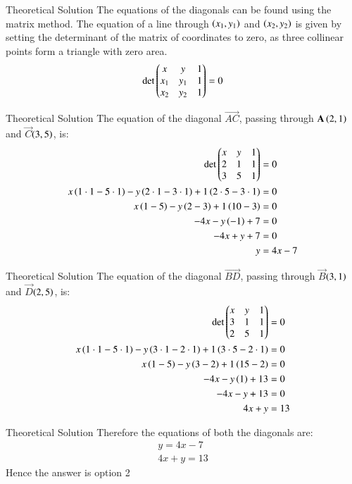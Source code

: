 \documentclass{beamer}
\begin{document}
\begin{frame}{Theoretical Solution}
The equations of the diagonals can be found using the matrix method. The equation of a line through $\left(x_1, y_1\right)$ and $\left(x_2, y_2\right)$ is given by setting the determinant of the matrix of coordinates to zero, as three collinear points form a triangle with zero area.
\begin{align*}
    \det \begin{pmatrix} x & y & 1 \\ x_1 & y_1 & 1 \\ x_2 & y_2 & 1 \end{pmatrix} = 0
\end{align*}
    
\end{frame}
\begin{frame}{Theoretical Solution}
The equation of the diagonal $\vec{AC}$, passing through $\mathbf{A}\left(2, 1\right)$ and $\vec{C}$$\left(3, 5\right)$, is:
\begin{align}
    \det \begin{pmatrix} x & y & 1 \\ 2 & 1 & 1 \\ 3 & 5 & 1 \end{pmatrix} &= 0 \\
    x\left(1 \cdot 1 - 5 \cdot 1\right) - y\left(2 \cdot 1 - 3 \cdot 1\right) + 1\left(2 \cdot 5 - 3 \cdot 1\right) &= 0 \\
    x\left(1 - 5\right) - y\left(2 - 3\right) + 1\left(10 - 3\right) &= 0 \\
    -4x - y\left(-1\right) + 7 &= 0 \\
    -4x + y + 7 &= 0 \\
    y &= 4x - 7
\end{align}
\end{frame}
\begin{frame}{Theoretical Solution}
The equation of the diagonal $\vec{BD}$, passing through $\vec{B}$$\left(3, 1\right)$ and $\vec{D}$$\left(2, 5\right)$, is:
\begin{align}
    \det \begin{pmatrix} x & y & 1 \\ 3 & 1 & 1 \\ 2 & 5 & 1 \end{pmatrix} &= 0 \\
    x\left(1 \cdot 1 - 5 \cdot 1\right) - y\left(3 \cdot 1 - 2 \cdot 1\right) + 1\left(3 \cdot 5 - 2 \cdot 1\right) &= 0 \\
    x\left(1 - 5\right) - y\left(3 - 2\right) + 1\left(15 - 2\right) &= 0 \\
    -4x - y\left(1\right) + 13 &= 0 \\
    -4x - y + 13 &= 0 \\
    4x + y &= 13
\end{align}
\end{frame}
\begin{frame}{Theoretical Solution}
Therefore the equations of both the diagonals are:
\begin{align}
    y=4x-7\\4x+y=13
\end{align}
Hence the answer is option 2
\end{frame}
\end{document}
